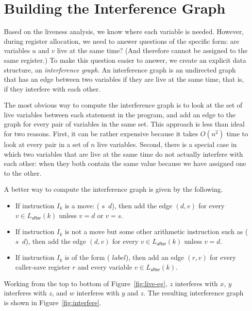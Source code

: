 \documentclass[11pt]{book}
\begin{document}
\section{Building the Interference Graph}

Based on the liveness analysis, we know where each variable is needed.
However, during register allocation, we need to answer questions of
the specific form: are variables $u$ and $v$ live at the same time?
(And therefore cannot be assigned to the same register.)  To make this
question easier to answer, we create an explicit data structure, an
\emph{interference graph}.  An interference graph is an undirected
graph that has an edge between two variables if they are live at the
same time, that is, if they interfere with each other.

The most obvious way to compute the interference graph is to look at
the set of live variables between each statement in the program, and
add an edge to the graph for every pair of variables in the same set.
This approach is less than ideal for two reasons. First, it can be
rather expensive because it takes $O(n^2)$ time to look at every pair
in a set of $n$ live variables. Second, there is a special case in
which two variables that are live at the same time do not actually
interfere with each other: when they both contain the same value
because we have assigned one to the other.

A better way to compute the interference graph is given by the
following.

\begin{itemize}
\item If instruction $I_k$ is a move: ( $s$\, $d$), then add
  the edge $(d,v)$ for every $v \in L_{\mathsf{after}}(k)$ unless $v =
  d$ or $v = s$.

\item If instruction $I_k$ is not a move but some other arithmetic
  instruction such as ( $s$\, $d$), then add the edge $(d,v)$
  for every $v \in L_{\mathsf{after}}(k)$ unless $v = d$.
  
\item If instruction $I_k$ is of the form (
  $\mathit{label}$), then add an edge $(r,v)$ for every caller-save
  register $r$ and every variable $v \in L_{\mathsf{after}}(k)$.
\end{itemize}

Working from the top to bottom of Figure~\ref{fig:live-eg}, $z$
interferes with $x$, $y$ interferes with $z$, and $w$ interferes with
$y$ and $z$.  The resulting interference graph is shown in
Figure~\ref{fig:interfere}.
\end{document}
